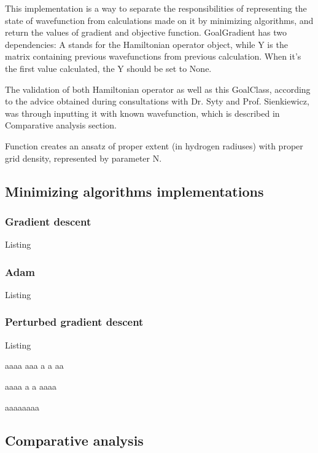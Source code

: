 \vspace{0.2cm}



This implementation is a way to separate the responsibilities of representing the state of wavefunction from calculations made on it by minimizing algorithms, and return the values of gradient and objective function. GoalGradient has two dependencies: A stands for the Hamiltonian operator object, while Y is the matrix containing previous wavefunctions from previous calculation. When it's the first value calculated, the Y should be set to None.

The validation of both Hamiltonian operator as well as this GoalClass, according to the advice obtained during consultations with Dr. Syty and Prof. Sienkiewicz, was through inputting it with known wavefunction, which is described in Comparative analysis section.

\vspace{0.2cm}


Function creates an ansatz of proper extent (in hydrogen radiuses) with proper grid density, represented by parameter N.

\subsection{Minimizing algorithms implementations}
\subsubsection{Gradient descent}

Listing

\subsubsection{Adam}

Listing

\subsubsection{Perturbed gradient descent}

Listing

aaaa
aaa
a
a
aa

aaaa
a
a
aaaa

aaaaaaaa

\subsection{Comparative analysis}



